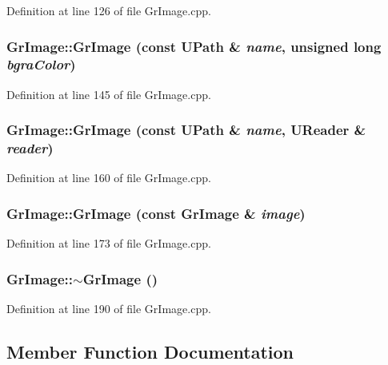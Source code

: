 \begin{CompactItemize}
Definition at line 126 of file GrImage.cpp.\hypertarget{class_gr_image_b0282a1c9f181f55eecc2b8ec3fd8f5f}{
\subsubsection[{GrImage}]{\setlength{\rightskip}{0pt plus 5cm}GrImage::GrImage (const {\bf UPath} \& {\em name}, \/  unsigned long {\em bgraColor})}}
\label{class_gr_image_b0282a1c9f181f55eecc2b8ec3fd8f5f}




Definition at line 145 of file GrImage.cpp.\hypertarget{class_gr_image_da3f5e31181211ee5d86659bc02c88b0}{
\subsubsection[{GrImage}]{\setlength{\rightskip}{0pt plus 5cm}GrImage::GrImage (const {\bf UPath} \& {\em name}, \/  {\bf UReader} \& {\em reader})}}
\label{class_gr_image_da3f5e31181211ee5d86659bc02c88b0}




Definition at line 160 of file GrImage.cpp.\hypertarget{class_gr_image_f18a44493540afaae3df7a93700afa32}{
\subsubsection[{GrImage}]{\setlength{\rightskip}{0pt plus 5cm}GrImage::GrImage (const {\bf GrImage} \& {\em image})}}
\label{class_gr_image_f18a44493540afaae3df7a93700afa32}




Definition at line 173 of file GrImage.cpp.\hypertarget{class_gr_image_e0891bd66f3e68c47d28ebd685908743}{
\subsubsection[{$\sim$GrImage}]{\setlength{\rightskip}{0pt plus 5cm}GrImage::$\sim$GrImage ()}}
\label{class_gr_image_e0891bd66f3e68c47d28ebd685908743}




Definition at line 190 of file GrImage.cpp.

\subsection{Member Function Documentation}
\hypertarget{class_gr_image_0a187b271d32fc3aa75a147b6e9e691b}{
}
\end{CompactItemize}
